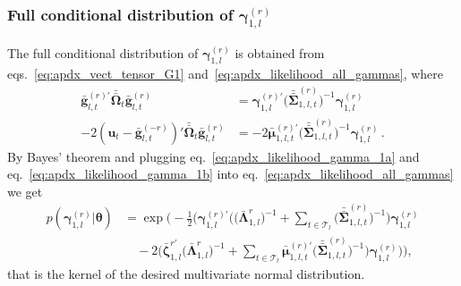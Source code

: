 \documentclass[12pt,a4paper]{article}
\theoremstyle{custom}
\begin{document}
\subsubsection{Full conditional distribution of $\boldsymbol{\gamma}_{1,l}^{(r)}$}
The full conditional distribution of $\boldsymbol{\gamma}_{1,l}^{(r)}$ is obtained from eqs.~\eqref{eq:apdx_vect_tensor_G1} and~\eqref{eq:apdx_likelihood_all_gammas}, where
\begin{align}
\label{eq:apdx_likelihood_gamma_1a}
\bar{\mathbf{g}}_{l,t}^{(r)\prime} \bar{\bar{\boldsymbol{\Omega}}}_t \bar{\mathbf{g}}_{l,t}^{(r)} & = \boldsymbol{\gamma}_{1,l}^{(r)\prime} \Big( \bar{\bar{\boldsymbol{\Sigma}}}_{1,l,t}^{(r)} \Big)^{-1} \boldsymbol{\gamma}_{1,l}^{(r)} \\
-2 (\mathbf{u}_t - \bar{\mathbf{g}}_{l,t}^{(-r)})' \bar{\bar{\boldsymbol{\Omega}}}_t \bar{\mathbf{g}}_{l,t}^{(r)} & = -2 \bar{\boldsymbol{\mu}}_{1,l,t}^{(r)\prime} \Big( \bar{\bar{\boldsymbol{\Sigma}}}_{1,l,t}^{(r)} \Big)^{-1} \boldsymbol{\gamma}_{1,l}^{(r)} \, .
\label{eq:apdx_likelihood_gamma_1b}
\end{align}
By Bayes' theorem and plugging eq.~\eqref{eq:apdx_likelihood_gamma_1a} and eq.~\eqref{eq:apdx_likelihood_gamma_1b} into eq.~\eqref{eq:apdx_likelihood_all_gammas} we get
\begin{align*}
p(\boldsymbol{\gamma}_{1,l}^{(r)} | \boldsymbol{\theta}) 
 & = \exp \Bigg( -\frac{1}{2} \Bigg( \boldsymbol{\gamma}_{1,l}^{(r)\prime} \Big( \Big( \bar{\boldsymbol{\Lambda}}_{1,l}^{r} \Big)^{-1} + \sum_{t\in\mathcal{T}_l} \Big(  \bar{\bar{\boldsymbol{\Sigma}}}_{1,l,t}^{(r)} \Big)^{-1} \Big) \boldsymbol{\gamma}_{1,l}^{(r)} \\ 
 & \quad -2 \Big( \bar{\boldsymbol{\zeta}}_{1,l}^{r'} \Big( \bar{\boldsymbol{\Lambda}}_{1,l}^{r} \Big)^{-1} + \sum_{t\in\mathcal{T}_l} \bar{\boldsymbol{\mu}}_{1,l,t}^{(r)\prime} \Big( \bar{\bar{\boldsymbol{\Sigma}}}_{1,l,t}^{(r)} \Big)^{-1} \Big) \boldsymbol{\gamma}_{1,l}^{(r)} \Bigg) \Bigg),
\end{align*}
that is the kernel of the desired multivariate normal distribution.
\end{document}
